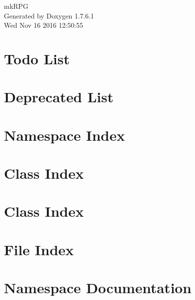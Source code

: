 \documentclass[a4paper]{book}
\begin{document}
\hypersetup{pageanchor=false,citecolor=blue}
\begin{titlepage}
\vspace*{7cm}
\begin{center}
{\Large mk\-R\-P\-G }\\
\vspace*{1cm}
{\large \-Generated by Doxygen 1.7.6.1}\\
\vspace*{0.5cm}
{\small Wed Nov 16 2016 12:50:55}\\
\end{center}
\end{titlepage}
\clearemptydoublepage
{}
\tableofcontents
\clearemptydoublepage
{}
\hypersetup{pageanchor=true,citecolor=blue}
\chapter{\-Todo \-List}
\label{todo}
\hypertarget{todo}{}

\chapter{\-Deprecated \-List}
\label{deprecated}
\hypertarget{deprecated}{}

\chapter{\-Namespace \-Index}

\chapter{\-Class \-Index}

\chapter{\-Class \-Index}

\chapter{\-File \-Index}

\chapter{\-Namespace \-Documentation}

\end{document}
